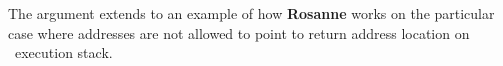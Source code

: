 \documentclass[format=acmsmall]{acmart}
\newcommand{\tool}{\textbf{Rosanne}}
\begin{document}
The argument extends to an example of how {\tool} works on the particular case where addresses are not allowed to point to return address location on \
execution stack. \\


%
%



\end{document}
